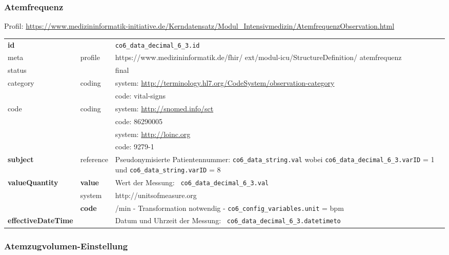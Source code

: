 \subsubsection{Atemfrequenz} 

Profil: \url{https://www.medizininformatik-initiative.de/Kerndatensatz/Modul_Intensivmedizin/AtemfrequenzObservation.html}

\begin{longtable}{|l|l|p{7.5cm}|}
        \hline
        \rowcolor{lightgray} \multicolumn{3}{|l|}{Data Mapping (inhaltlich)} \\ \hline
        \textbf{id} &  & \texttt{co6\_data\_decimal\_6\_3.id} \\ \hline
	meta & profile & https://www.medizininformatik.de/fhir/ ext/modul-icu/StructureDefinition/ atemfrequenz \\ \hline 
	status &  & final   \\ \hline 
	category & coding & system: \url{http://terminology.hl7.org/CodeSystem/observation-category} \\
\cline{3-3}
	& & code: vital-signs\\ \hline
	code & coding & system: \url{http://snomed.info/sct} \\ 
	\cline{3-3} 
	 &  & code: 86290005 \\ 
	 \cline{3-3} 
	 &  & system: \url{http://loinc.org} \\ 
	 \cline{3-3} 
	 &  & code: 9279-1 \\ \hline
	 \textbf{subject} & reference & Pseudonymisierte Patientennummer: \texttt{co6\_data\_string.val} wobei \texttt{co6\_data\_decimal\_6\_3.varID} = 1 und \texttt{co6\_data\_string.varID} = 8 \\ \hline
	 \textbf{valueQuantity}  & \textbf{value} & Wert der Messung: \texttt{
co6\_data\_decimal\_6\_3.val} \\
        \cline{2-3}
         & system & http://unitsofmeasure.org \\
         \cline{2-3}
         & \textbf{code} & /min - Transformation notwendig - \texttt{co6\_config\_variables.unit} = bpm 
\\ \hline
     \textbf{effectiveDateTime}  & & Datum und Uhrzeit der Messung: \texttt{
co6\_data\_decimal\_6\_3.datetimeto} \\ \hline
\end{longtable}

\subsubsection{Atemzugvolumen-Einstellung} 

